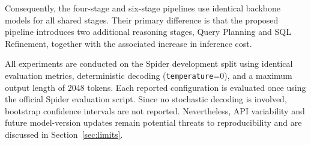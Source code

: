 \documentclass{svproc}
\begin{document}
Consequently, the four-stage and six-stage pipelines use identical backbone models for all shared stages. Their primary difference is that the proposed pipeline introduces two additional reasoning stages, Query Planning and SQL Refinement, together with the associated increase in inference cost.







All experiments are conducted on the Spider development split using identical evaluation metrics, deterministic decoding (\texttt{temperature}=0), and a maximum output length of 2048 tokens. Each reported configuration is evaluated once using the official Spider evaluation script. Since no stochastic decoding is involved, bootstrap confidence intervals are not reported. Nevertheless, API variability and future model-version updates remain potential threats to reproducibility and are discussed in Section~\ref{sec:limits}.
\end{document}
